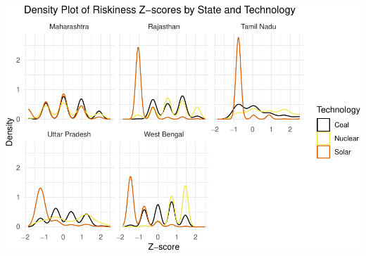 \documentclass[
]{article}
\begin{document}
\includegraphics{nuclear-in-comparison_files/figure-latex/unnamed-chunk-40-4.pdf}
\end{document}
